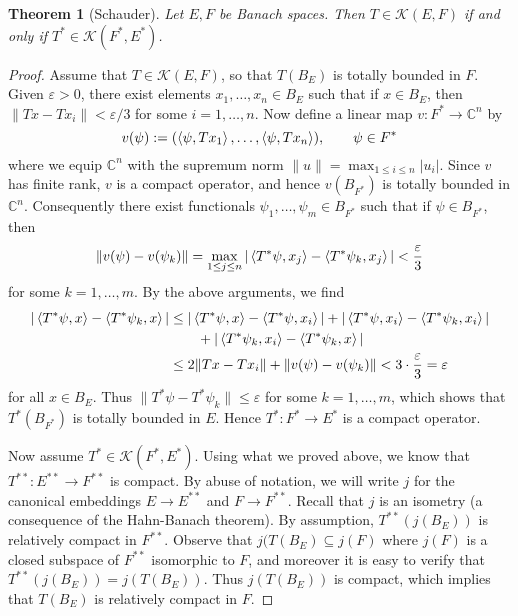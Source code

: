 \documentclass[11pt]{article}
\numberwithin{equation}{section}
\theoremstyle{plain}
\newtheorem{theorem}{Theorem}[section]
\theoremstyle{definition}
\newcommand{\CC}{\mathbb{C}}
\begin{document}
	\begin{theorem}[Schauder]
		Let $E,F$ be Banach spaces. Then $T\in\mathcal{K}(E,F)$ if and only if $T^*\in\mathcal{K}(F^*,E^*)$.
	\end{theorem}
	\begin{proof}
		Assume that $T\in\mathcal{K}(E,F)$, so that $T(B_E)$ is totally bounded in $F$. Given $\varepsilon >0$, there exist elements $x_1,\ldots,x_n\in B_E$ such that if $x\in B_E$, then $\|Tx-Tx_i\| < \varepsilon/3$ for some $i=1,\ldots,n$. Now define a linear map $v:F^*\to\CC^n$ by
		\begin{equation*}
			v(\psi) := (\braket{\psi,Tx_1}, \ldots, \braket{\psi,Tx_n}), \qquad \psi\in F^*
		\end{equation*}
		where we equip $\CC^n$ with the supremum norm $\|u\|=\max_{1\le i\le n}|u_i|$. Since $v$ has finite rank, $v$ is a compact operator, and hence $v(B_{F^*})$ is totally bounded in $\CC^n$. Consequently there exist functionals $\psi_1,\ldots,\psi_m\in B_{F^*}$ such that if $\psi\in B_{F^*}$, then
		\begin{equation*}
			\|v(\psi)-v(\psi_k)\| = \max_{1\le j\le n}|\braket{T^*\psi,x_j}-\braket{T^*\psi_k,x_j}| < \frac{\varepsilon}{3}
		\end{equation*}
		for some $k=1,\ldots,m$. By the above arguments, we find
		\begin{align*}
			|\braket{T^*\psi,x}-\braket{T^*\psi_k,x}| &\le |\braket{T^*\psi,x}-\braket{T^*\psi,x_i}| + |\braket{T^*\psi,x_i}-\braket{T^*\psi_k,x_i}| \\
			&\qquad + |\braket{T^*\psi_k,x_i}-\braket{T^*\psi_k,x}| \\
			&\le 2\|Tx-Tx_i\| + \|v(\psi)-v(\psi_k)\| < 3 \cdot\frac{\varepsilon}{3}=\varepsilon
		\end{align*}
		for all $x\in B_E$. Thus $\|T^*\psi -T^*\psi_k\|\le\varepsilon$ for some $k=1,\ldots,m$, which shows that $T^*(B_{F^*})$ is totally bounded in $E$. Hence $T^*:F^*\to E^*$ is a compact operator.
		
		Now assume $T^*\in\mathcal{K}(F^*,E^*)$. Using what we proved above, we know that $T^{**}:E^{**}\to F^{**}$ is compact. By abuse of notation, we will write $j$ for the canonical embeddings $E\to E^{**}$ and $F\to F^{**}$. Recall that $j$ is an isometry (a consequence of the Hahn-Banach theorem). By assumption, $T^{**}(j(B_E))$ is relatively compact in $F^{**}$. Observe that $j(T(B_E) \subseteq j(F)$ where $j(F)$ is a closed subspace of $F^{**}$ isomorphic to $F$, and moreover it is easy to verify that $T^{**}(j(B_E)) = j(T(B_E))$. Thus $j(T(B_E))$ is compact, which implies that $T(B_E)$ is relatively compact in $F$.
	\end{proof}
	
\end{document}
